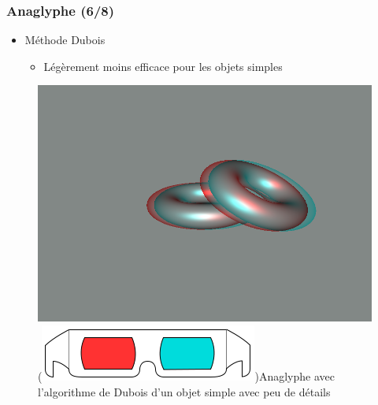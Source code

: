 \documentclass{beamer}
\begin{document}
%
% 
\begin{frame}
\frametitle{Anaglyphe (6/8)}
\begin{itemize}[label=$\bullet$]
\item Méthode Dubois \cite{algoDubois}
	\begin{itemize}[label=$\circ$]
	\item Légèrement moins efficace pour les objets simples 
	\end{itemize}
\end{itemize}
\begin{figure}
\centering
\includegraphics[scale=0.35]{donuts_dubois.png}
\caption{(\includegraphics[scale=0.1]{lunettes.png})Anaglyphe avec l'algorithme de Dubois d'un objet simple avec peu de détails}
\end{figure}
\end{frame}
% 
\end{document}
